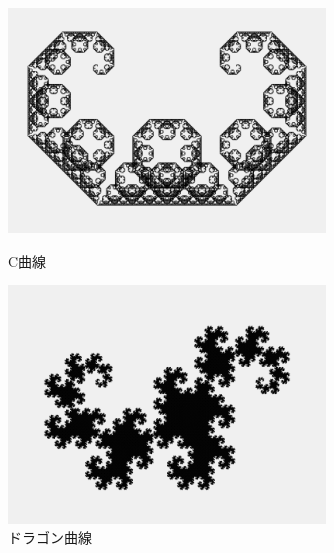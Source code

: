\documentclass[dvipdfmx]{jsarticle}
\theoremstyle{definition}
\begin{document}
\begin{figure}[H]
    \begin{minipage}{0.49\hsize}
        \centering
        \includegraphics[width=0.75\textwidth]{figure/others/curve/c_curve.png}
        \caption{C曲線}
    \end{minipage}
    \begin{minipage}{0.49\hsize}
        \centering
        \includegraphics[width=0.75\textwidth]{figure/others/curve/dragon_curve.png}
        \caption{ドラゴン曲線}
    \end{minipage}
\end{figure}
\end{document}
